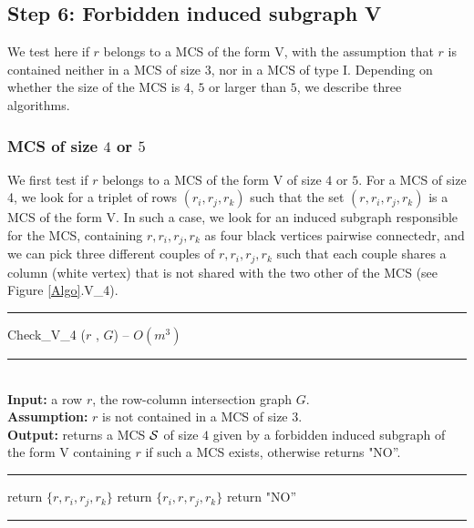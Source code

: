 \documentclass{article}
\begin{document}
\subsection{Step 6: Forbidden induced subgraph V}
 
We test here if $r$ belongs to a MCS of the form V, with the assumption that  
$r$ is contained neither in a MCS of size $3$, nor in a MCS of type I.
Depending on whether the size of the MCS is $4$, $5$ or larger than $5$, 
we describe three algorithms.

\subsubsection{MCS of size $4$ or $5$}

We first test if $r$ belongs to a MCS of the form V of size $4$ or $5$.
For a MCS of size 4, we look  for a triplet of rows 
$(r_i,r_j,r_k)$ such that the set $(r,r_i,r_j,r_k)$ is a MCS of the
form V. In such a case, we look for an induced
subgraph responsible for the MCS, containing $r,r_i,r_j,r_k$ as four black 
vertices pairwise connectedr, and we can pick three different couples of
$r,r_i,r_j,r_k$ such that each couple shares a column (white vertex) that 
is not shared with the two other of the MCS (see Figure \ref{Algo}.V\_4). 

\begin{algorithm}[htpb]                      
\rule{11.7cm}{0.01cm}
\caption{Check\_V\_4 ($r$ , $G$) -- $O(m^3)$} 
\rule{11.7cm}{0.01cm}
\\
{\bf Input:} a row $r$, the row-column intersection graph $G$.\\
{\bf Assumption:}  $r$ is not contained in a MCS of size $3$.\\
{\bf Output:} returns a MCS ${\cal S}$ of size $4$ given by a forbidden 
induced subgraph of the form V containing $r$ if such a MCS exists, otherwise returns  "NO''.
\rule{11.7cm}{0.01cm}
\begin{algorithmic}[1]
\STATE return $\{r,r_i,r_j,r_k\}$
\ENDIF
{}
\STATE return $\{r_i,r,r_j,r_k\}$
\ENDIF
\ENDIF
\ENDFOR 
\STATE return "NO''
\end{algorithmic}
\rule{11.7cm}{0.01cm}
\end{algorithm}
\end{document}

